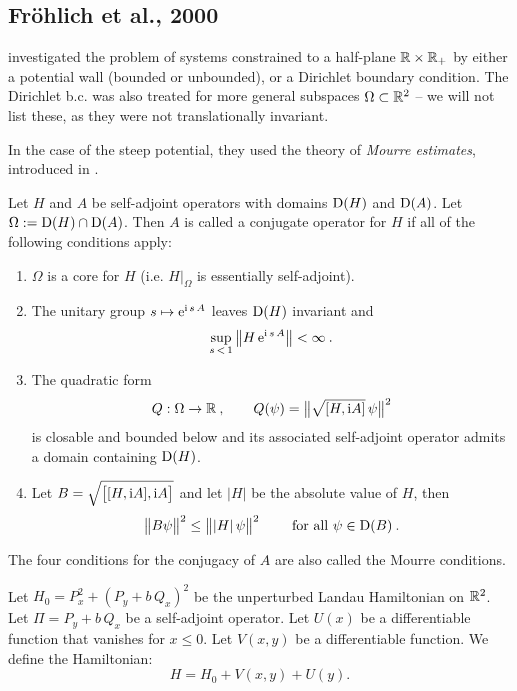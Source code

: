 \subsection{Fröhlich et al., 2000}
\cite{Frohlich2000} investigated the problem of systems constrained to a half-plane $\mathbb{R} \times \mathbb{R}_+$ by either a potential wall (bounded or unbounded), or a Dirichlet boundary condition. The Dirichlet b.c. was also treated for more general subspaces $\Omega \subset \mathbb{R}^2$ – we will not list these, as they were not translationally invariant.

In the case of the steep potential, they used the theory of \textit{Mourre estimates}, introduced in \cite{Mourre1981}.

\begin{defn}
    Let $H$ and $A$ be self-adjoint operators with domains $\mathrm{D}(H)$ and $\mathrm{D}(A)$. Let $\Omega := \mathrm{D}(H) \cap \mathrm{D}(A)$. Then $A$ is called a conjugate operator for $H$ if all of the following conditions apply:
    \begin{enumerate}
        \item $\Omega$ is a core for $H$ (i.e. $H|_\Omega$ is essentially self-adjoint).
        \item The unitary group $s \mapsto \mathrm{e}^{\mathrm{i} \, s \, A}$ leaves $\mathrm{D}(H)$ invariant and $$ \sup_{s\,<\,1} \big\lVert H \, \mathrm{e}^{\mathrm{i} \, s \, A} \big\rVert < \infty \: .$$
        \item The quadratic form $$Q: \Omega \to \mathbb{R} \: , \qquad Q(\psi) = \big\lVert  \sqrt{[ H, \mathrm{i} A ]} \, \psi  \big\rVert^2$$ is closable and bounded below and its associated self-adjoint operator admits a domain containing $\mathrm{D}(H)$.
        \item Let $B = \sqrt{\big[ [H, \mathrm{i} A], \mathrm{i} A \big]}$ and let $|H|$ be the absolute value of $H$, then $$\big\lVert  B \psi  \big\rVert^2 \leq \big\lVert  |H| \, \psi \big\rVert^2 \qquad \text{ for all } \psi \in \mathrm{D}(B) \: .$$
    \end{enumerate}
    The four conditions for the conjugacy of $A$ are also called the Mourre conditions.
\end{defn}

\begin{defn}
    Let $H_0 = P_x^2 + (P_y + b \, Q_x)^2$ be the unperturbed Landau Hamiltonian on $\mathbb{R}^2$. Let $\Pi = P_y + b \, Q_x$ be a self-adjoint operator. Let $U(x)$ be a differentiable function that vanishes for $x\leq 0$. Let $V(x,y)$ be a differentiable function. We define the Hamiltonian:
    $$ H = H_0 + V(x,y) + U(y). $$
\end{defn}

